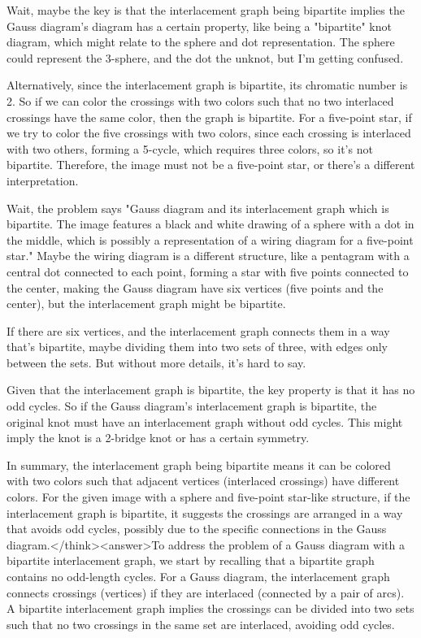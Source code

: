 Wait, maybe the key is that the interlacement graph being bipartite implies the Gauss diagram's diagram has a certain property, like being a "bipartite" knot diagram, which might relate to the sphere and dot representation. The sphere could represent the 3-sphere, and the dot the unknot, but I'm getting confused. 

Alternatively, since the interlacement graph is bipartite, its chromatic number is 2. So if we can color the crossings with two colors such that no two interlaced crossings have the same color, then the graph is bipartite. For a five-point star, if we try to color the five crossings with two colors, since each crossing is interlaced with two others, forming a 5-cycle, which requires three colors, so it's not bipartite. Therefore, the image must not be a five-point star, or there's a different interpretation. 

Wait, the problem says "Gauss diagram and its interlacement graph which is bipartite. The image features a black and white drawing of a sphere with a dot in the middle, which is possibly a representation of a wiring diagram for a five-point star." Maybe the wiring diagram is a different structure, like a pentagram with a central dot connected to each point, forming a star with five points connected to the center, making the Gauss diagram have six vertices (five points and the center), but the interlacement graph might be bipartite. 

If there are six vertices, and the interlacement graph connects them in a way that's bipartite, maybe dividing them into two sets of three, with edges only between the sets. But without more details, it's hard to say. 

Given that the interlacement graph is bipartite, the key property is that it has no odd cycles. So if the Gauss diagram's interlacement graph is bipartite, the original knot must have an interlacement graph without odd cycles. This might imply the knot is a 2-bridge knot or has a certain symmetry. 

In summary, the interlacement graph being bipartite means it can be colored with two colors such that adjacent vertices (interlaced crossings) have different colors. For the given image with a sphere and five-point star-like structure, if the interlacement graph is bipartite, it suggests the crossings are arranged in a way that avoids odd cycles, possibly due to the specific connections in the Gauss diagram.</think><answer>To address the problem of a Gauss diagram with a bipartite interlacement graph, we start by recalling that a bipartite graph contains no odd-length cycles. For a Gauss diagram, the interlacement graph connects crossings (vertices) if they are interlaced (connected by a pair of arcs). A bipartite interlacement graph implies the crossings can be divided into two sets such that no two crossings in the same set are interlaced, avoiding odd cycles.  

